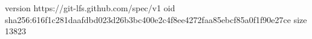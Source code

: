 version https://git-lfs.github.com/spec/v1
oid sha256:616f1c281daafdbd023d26b3bc400e2c4f8ee4272faa85ebcf85a0f1f90e27ce
size 13823
